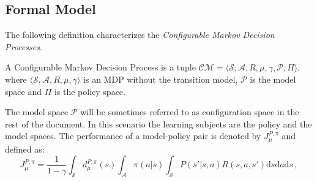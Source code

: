  \subsection{Formal Model}
 The following definition characterizes the \textit{Configurable Markov Decision Processes}.
 
 \begin{definition}
 	A Configurable Markov Decision Process is a tuple $\mathcal{CM}= \langle \mathcal{S}, \mathcal{A}, R, \mu, \gamma, \mathcal{P}, \Pi\rangle$, where $\langle \mathcal{S}, \mathcal{A}, R, \mu, \gamma \rangle$ is an MDP without the transition model, $\mathcal{P}$ is the model space and $\Pi$ is the policy space.
 \end{definition}
 The model space $\mathcal{P}$ will be sometimes referred to as configuration space in the rest of the document.
In this scenario the learning subjects are the policy and the model spaces. The performance of a model-policy pair is denoted by $J_{\mu}^{P, \pi}$ and defined as:
\begin{equation}
	J_{\mu}^{P, \pi} = \frac{1}{1-\gamma}\int_{\mathcal{S}}d_{\mu}^{P,\pi}(s) \int_{\mathcal{A}}\pi(a | s) \int_{\mathcal{S}} P(s' | s, a)R(s,a,s') \mathrm{d}s \mathrm{d}a \mathrm{d}s \, ,
\end{equation}

